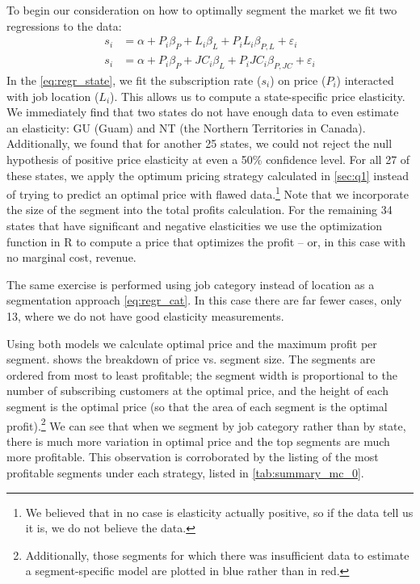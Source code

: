 \section{} \label{sec:q2} %
To begin our consideration on how to optimally segment the market we fit two regressions to the data:
\begin{align}
s_i &= \alpha +  P_i \beta_P + L_i \beta_L + P_i L_i \beta_{P,L} + \varepsilon_i \label{eq:regr_state} \\
s_i &= \alpha +  P_i \beta_P + JC_i \beta_L + P_i JC_i \beta_{P,JC} + \varepsilon_i \label{eq:regr_cat}
\end{align}
In the \vref{eq:regr_state}, we fit the subscription rate ($s_i$) on price ($P_i$) interacted with job location ($L_i$). This allows us to compute a state-specific price elasticity. We immediately find that two states do not have enough data to even estimate an elasticity: GU (Guam) and NT (the Northern Territories in Canada).  Additionally, we found that for another 25 states, we could not reject the null hypothesis of positive price elasticity at even a 50\% confidence level. For all 27 of these states, we apply the optimum pricing strategy calculated in \cref{sec:q1} instead of trying to predict an optimal price with flawed data.\footnote{We believed that in no case is elasticity actually positive, so if the data tell us it is, we do not believe the data.} Note that we incorporate the size of the segment into the total profits calculation.  For the remaining 34 states that have significant and negative elasticities we use the optimization function in R to compute a price that optimizes the profit -- or, in this case with no marginal cost, revenue.

The same exercise is performed using job category instead of location as a segmentation approach \vref{eq:regr_cat}.  In this case there are far fewer cases, only 13, where we do not have good elasticity measurements.

Using both models we calculate optimal price and the maximum profit per segment.   shows the breakdown of price vs. segment size. The segments are ordered from most to least profitable; the segment width is proportional to the number of subscribing customers at the optimal price, and the height of each segment is the optimal price (so that the area of each segment is the optimal profit).\footnote{Additionally, those segments for which there was insufficient data to estimate a segment-specific model are plotted in blue rather than in red.} We can see that when we segment by job category rather than by state, there is much more variation in optimal price and the top segments are much more profitable. This observation is corroborated by the listing of the most profitable segments under each strategy, listed in \vref{tab:summary_mc_0}.

